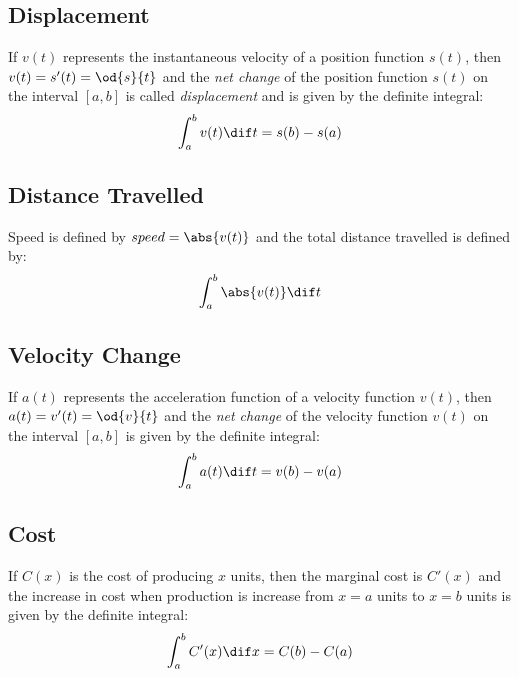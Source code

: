 \subsection{Displacement}
	If $v(t)$ represents the instantaneous velocity of a position function $s(t)$, then $v(t) = s'(t) = \od{s}{t}$ and the \emph{net change} of the position function $s(t)$ on the interval $[a,b]$ is called \emph{displacement} and is given by the definite integral:
	\[\int_a^b v(t) \dif t = s(b) - s(a)\]
\subsection{Distance Travelled}
	Speed is defined by $speed = \abs{v(t)}$ and the total distance travelled is defined by:
	\[\int_a^b \abs{v(t)} \dif t\]
\subsection{Velocity Change}
	If $a(t)$ represents the acceleration function of a velocity function $v(t)$, then $a(t) = v'(t) = \od{v}{t}$ and the \emph{net change} of the velocity function $v(t)$ on the interval $[a,b]$ is given by the definite integral:
	\[\int_a^b a(t) \dif t = v(b) - v(a)\]
\subsection{Cost}
	If $C(x)$ is the cost of producing $x$ units, then the marginal cost is $C'(x)$ and the increase in cost when production is increase from $x=a$ units to $x=b$ units is given by the definite integral:
	\[\int_a^b C'(x) \dif x = C(b) - C(a)\]
